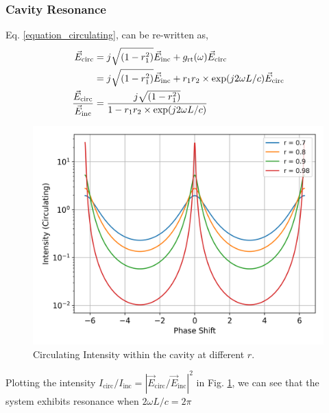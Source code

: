 \documentclass{Resources/cquicc}
\begin{document}
\subsubsection{Cavity Resonance}
Eq. \ref{equation_circulating}, can be re-written as,
\begin{equation}
\begin{split}
    \vec{E}_{\text{circ}} & = j \sqrt{(1-r_1^2)} \vec{E}_{\text{inc}} + g_{\text{rt}}(\omega) \vec{E}_{\text{circ}} \\
    & = j \sqrt{(1-r_1^2)} \vec{E}_{\text{\text{inc}}} + r_1r_2\times \exp(j2\omega L/c)  \vec{E}_{\text{circ}}\\
    \frac{\vec{E}_{\text{circ}}}{\vec{E}_{\text{inc}}} & = \frac{j\sqrt{(1-r_1^2)}}{1-r_1r_2\times \exp(j2\omega L/c)}
\end{split}
\label{eqn:cavity_resonance}
\end{equation}
\begin{figure}
    \centering
    \includegraphics[width=\linewidth]{images/Cavity_resonance.png}
    \caption{Circulating Intensity within the cavity at different $r$.}
    \label{fig:cavity_resonance}
\end{figure}
Plotting the intensity ${I_{\text{circ}}}/{I_{\text{inc}}} = |{\vec{E}_{\text{circ}}}/{\vec{E}_{\text{inc}}}|^2$ in Fig. \ref{fig:cavity_resonance}, we can see that the system exhibits resonance when $2\omega L /c = 2 \pi$
\end{document}
